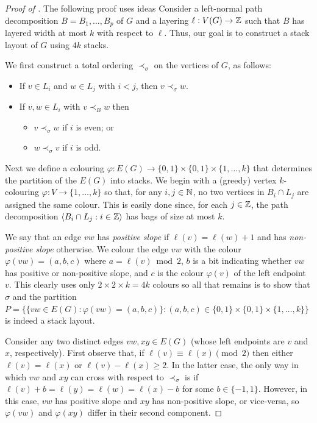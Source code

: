 \documentclass{patmorin}
\begin{document}
\begin{proof}[Proof of ]
  The following proof uses ideas
  Consider a left-normal path decomposition $B=B_1,\ldots,B_p$ of $G$ and a layering $\ell:V(G)\to\mathbb{Z}$ such that $B$ has layered width at most $k$ with respect to $\ell$.  Thus, our goal is to construct a stack layout of $G$ using $4k$ stacks.

  We first construct a total ordering $\prec_\sigma$ on the vertices of $G$, as follows:
  \begin{itemize}
    \item If $v\in L_i$ and $w\in L_j$ with $i < j$, then $v\prec_\sigma w$.
    \item If $v,w\in L_i$ with $v \prec_B w$ then
    \begin{itemize}
      \item $v\prec_\sigma w$ if $i$ is even; or
      \item $w\prec_\sigma v$ if $i$ is odd.
    \end{itemize}
  \end{itemize}

  Next we define a colouring $\varphi:E(G)\to\{0,1\}\times\{0,1\}\times\{1,\ldots,k\}$ that determines the partition of the $E(G)$ into stacks.  We begin with a (greedy) vertex $k$-colouring $\varphi:V\to \lbrace 1,\ldots,k\rbrace$ so that, for any $i,j\in\mathbb{N}$, no two vertices in $B_i\cap L_j$ are assigned the same colour. This is easily done since, for each $j\in\mathbb{Z}$, the path decomposition $\langle B_i\cap L_j : i\in \mathbb{Z}\rangle$ has bags of size at most $k$.

  We say that an edge $vw$ has \emph{positive slope} if $\ell(v)=\ell(w)+1$ and has \emph{non-positive slope} otherwise.  We colour the edge $vw$ with the colour $\varphi(vw)=(a,b,c)$ where $a=\ell(v)\bmod 2$, $b$ is a bit indicating whether $vw$ has positive or non-positive slope, and $c$ is the colour $\varphi(v)$ of the left endpoint $v$.  This clearly uses only $2\times2\times k=4k$ colours so all that remains is to show that
  $\sigma$ and the partition $P=\{\{vw\in E(G):\varphi(vw)=(a,b,c)\}:(a,b,c)\in \{0,1\}\times\{0,1\}\times\{1,\ldots,k\}\}$  is indeed a stack layout.

  Consider any two distinct edges $vw,xy\in E(G)$ (whose left endpoints are $v$ and $x$, respectively).  First observe that, if $\ell(v)\equiv \ell(x)\pmod 2$ then either $\ell(v)=\ell(x)$ or $\ell(v)-\ell(x)\ge 2$. In the latter case, the only way in which $vw$ and $xy$ can cross with respect to $\prec_\sigma$ is if $\ell(v)+b = \ell(y)=\ell(w) = \ell(x)-b$ for some $b\in\{-1,1\}$. However, in this case, $vw$ has positive slope and $xy$ has non-positive slope, or vice-versa, so $\varphi(vw)$ and $\varphi(xy)$ differ in their second component.


\end{proof}
\end{document}
